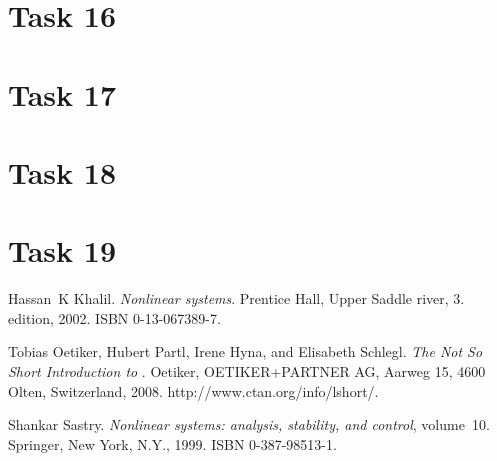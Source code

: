 \documentclass[a4paper,12pt,oneside,onecolumn]{article} %
\begin{document}


\section*{Task 16}



\section*{Task 17}



\section*{Task 18}



\section*{Task 19}






\begin{thebibliography}{99}
Hassan~K Khalil.
\newblock \emph{Nonlinear systems}.
\newblock Prentice Hall, Upper Saddle river, 3. edition, 2002.
\newblock ISBN 0-13-067389-7.

Tobias Oetiker, Hubert Partl, Irene Hyna, and Elisabeth Schlegl.
\newblock \emph{The Not So Short Introduction to \LaTeXe}.
\newblock Oetiker, OETIKER+PARTNER AG, Aarweg 15, 4600 Olten, Switzerland,
  2008.
\newblock http://www.ctan.org/info/lshort/.

Shankar Sastry.
\newblock \emph{Nonlinear systems: analysis, stability, and control},
  volume~10.
\newblock Springer, New York, N.Y., 1999.
\newblock ISBN 0-387-98513-1.
\end{thebibliography}
\end{document}
